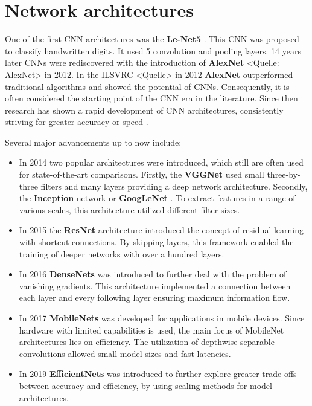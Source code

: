 \section{Network architectures}
\label{sec:networkArchitectures}

One of the first CNN architectures was the \textbf{Le-Net5} \cite{LeNet5}.
This CNN was proposed to classify handwritten digits.
It used 5 convolution and pooling layers.
14 years later CNNs were rediscovered with the introduction of \textbf{AlexNet} <Quelle: AlexNet> in 2012.
In the \ac{ILSVRC} <Quelle> in 2012 \textbf{AlexNet} outperformed traditional algorithms and showed the potential of CNNs.
Consequently, it is often considered the starting point of the CNN era in the literature.
Since then research has shown a rapid development of CNN architectures, consistently striving for greater accuracy or speed \cite{networkArchitectureSurvey}.

\vspace{1cm} %

\noindent Several major advancements up to now include:

\begin{itemize}
    \item In 2014 two popular architectures were introduced, which still are often used for state-of-the-art comparisons. Firstly, the \textbf{\ac{VGGNet}} \cite{VGGNet2015} used small three-by-three filters and many layers providing a deep network architecture. Secondly, the \textbf{Inception} network or \textbf{GoogLeNet} \cite{InceptionNet}. To extract features in a range of various scales, this architecture utilized different filter sizes.
    \item In 2015 the \textbf{ResNet} architecture \cite{ResNet} introduced the concept of residual learning with shortcut connections. By skipping layers, this framework enabled the training of deeper networks with over a hundred layers.
    \item In 2016 \textbf{DenseNets} \cite{DenseNets} was introduced to further deal with the problem of vanishing gradients. This architecture implemented a connection between each layer and every following layer ensuring maximum information flow.
    \item In 2017 \textbf{MobileNets} \cite{MobileNetV1} \cite{MobileNetV2} \cite{MobileNetV3} was developed for applications in mobile devices. Since hardware with limited capabilities is used, the main focus of MobileNet architectures lies on efficiency. The utilization of depthwise separable convolutions allowed small model sizes and fast latencies.
    \item In 2019 \textbf{EfficientNets} \cite{EfficientNet} was introduced to further explore greater trade-offs between accuracy and efficiency, by using scaling methods for model architectures. 
\end{itemize}

